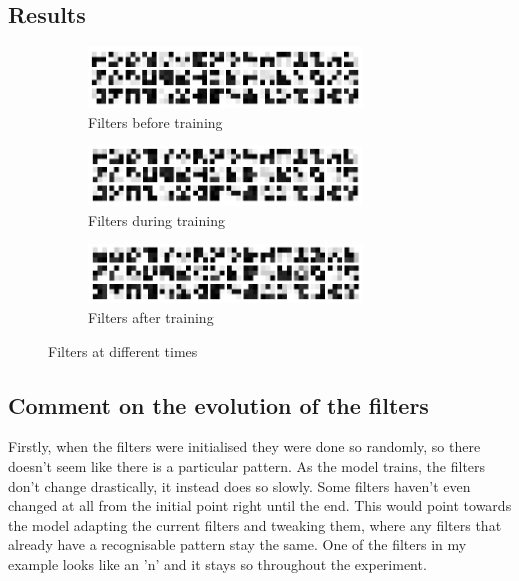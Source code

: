 \documentclass{article}
\begin{document}
    \subsection{Results}
    \begin{figure}[h!]
        \centering
        \begin{subfigure}[t]{0.8\textwidth}
            \centering
            \includegraphics[width=0.8\textwidth]{Filters_before}
            \caption{Filters before training}
        \end{subfigure}
        \begin{subfigure}[t]{0.8\textwidth}
            \centering
            \includegraphics[width=0.8\textwidth]{Filters_during}
            \caption{Filters during training}
        \end{subfigure}
        \begin{subfigure}[t]{0.8\textwidth}
            \centering
            \includegraphics[width=0.8\textwidth]{Filters_after}
            \caption{Filters after training}
        \end{subfigure}
        \caption{Filters at different times}
    \end{figure}

    \subsection{Comment on the evolution of the filters}

    Firstly, when the filters were initialised they were done so randomly, so there doesn't seem like there is a particular pattern. As the model trains, the filters don't change drastically, it instead does so slowly. Some filters haven't even changed at all from the initial point right until the end. This would point towards the model adapting the current filters and tweaking them, where any filters that already have a recognisable pattern stay the same. One of the filters in my example looks like an 'n' and it stays so throughout the experiment.\\
\end{document}
